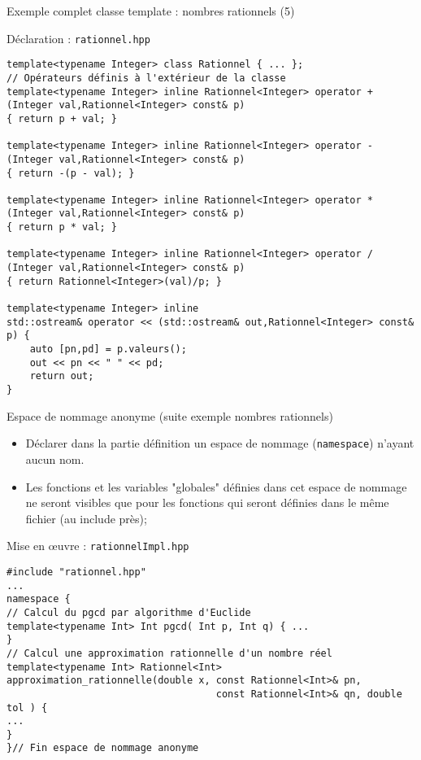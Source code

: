 \documentclass[compress,10pt,aspectratio=169]{beamer}
\begin{document}
\begin{frame}[fragile]{Exemple complet classe template : nombres rationnels (5)}
\scriptsize\vspace*{-5mm}
\begin{block}{\small Déclaration : \texttt{rationnel.hpp}}
\begin{verbatim}
template<typename Integer> class Rationnel { ... };
// Opérateurs définis à l'extérieur de la classe
template<typename Integer> inline Rationnel<Integer> operator + (Integer val,Rationnel<Integer> const& p)
{ return p + val; }

template<typename Integer> inline Rationnel<Integer> operator - (Integer val,Rationnel<Integer> const& p)
{ return -(p - val); }

template<typename Integer> inline Rationnel<Integer> operator * (Integer val,Rationnel<Integer> const& p)
{ return p * val; }

template<typename Integer> inline Rationnel<Integer> operator / (Integer val,Rationnel<Integer> const& p)
{ return Rationnel<Integer>(val)/p; }

template<typename Integer> inline 
std::ostream& operator << (std::ostream& out,Rationnel<Integer> const& p) {
    auto [pn,pd] = p.valeurs();
    out << pn << " " << pd;
    return out;                                                           }
\end{verbatim}
\end{block}
\end{frame}

\begin{frame}[fragile]{Espace de nommage anonyme (suite exemple nombres rationnels)}
\scriptsize

\begin{itemize}
\item Déclarer dans la partie définition un espace de nommage (\texttt{namespace})
      n'ayant aucun nom. 
\item Les fonctions et les variables "globales" définies dans cet espace de
      nommage ne seront visibles que pour les fonctions qui seront définies dans
      le même fichier (au include près);
\end{itemize}

\begin{block}{\small Mise en {{\oe}uvre} : \texttt{rationnelImpl.hpp}}
\begin{verbatim}
#include "rationnel.hpp"
...      
namespace {
// Calcul du pgcd par algorithme d'Euclide
template<typename Int> Int pgcd( Int p, Int q) { ... 
}
// Calcul une approximation rationnelle d'un nombre réel
template<typename Int> Rationnel<Int> 
approximation_rationnelle(double x, const Rationnel<Int>& pn, 
                                    const Rationnel<Int>& qn, double tol ) {
...
}
}// Fin espace de nommage anonyme
\end{verbatim}
\end{block}
\end{frame}
\end{document}
